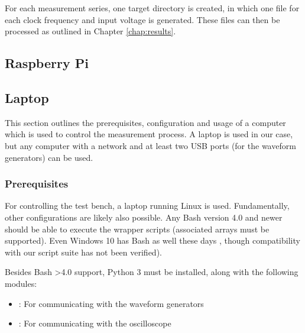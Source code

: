 For each  measurement series, one  target directory  is created, in  which one
file for each clock frequency and  input voltage is generated. These files can
then be processed as outlined in Chapter \ref{chap:results}.


\subsection{Raspberry Pi}
\label{subsec:raspi}



\subsection{Laptop}
\label{subsec:laptop}

This section outlines the prerequisites, configuration and usage of a computer
which is  used to  control the  measurement process. A laptop  is used  in our
case, but  any computer with  a network  and at least  two USB ports  (for the
waveform generators) can be used.


\subsubsection{Prerequisites}
\label{subsubsec:laptop:prereqs}

For controlling the test bench, a laptop running Linux is used. Fundamentally,
other configurations are likely also  possible. Any Bash version 4.0 and newer
should  be able  to execute  the wrapper  scripts (associated  arrays must  be
supported). Even Windows 10  has Bash as well  these days \cite{ref:W10:bash},
though compatibility with our script suite has not been verified).

Besides  Bash  >4.0 support,  Python  3  must  be  installed, along  with  the
following modules:

\begin{itemize}\tightlist
    \item
        : For communicating with the waveform generators
    \item
        : For communicating with the oscilloscope
\end{itemize}

